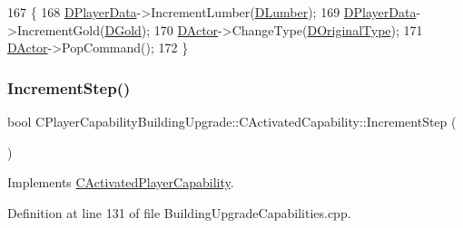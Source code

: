\begin{DoxyCode}
167                                                                  \{
168     \hyperlink{classCActivatedPlayerCapability_a9bf27c322a73f4b11c8183cc1973c3d8}{DPlayerData}->IncrementLumber(\hyperlink{classCPlayerCapabilityBuildingUpgrade_1_1CActivatedCapability_a497437c6eb755ccc9b18ff2a1e704c72}{DLumber});
169     \hyperlink{classCActivatedPlayerCapability_a9bf27c322a73f4b11c8183cc1973c3d8}{DPlayerData}->IncrementGold(\hyperlink{classCPlayerCapabilityBuildingUpgrade_1_1CActivatedCapability_a86bea8030ade6995b4bb5b253fe9466c}{DGold});
170     \hyperlink{classCActivatedPlayerCapability_a54ca944b47bff2718330639941d402b0}{DActor}->ChangeType(\hyperlink{classCPlayerCapabilityBuildingUpgrade_1_1CActivatedCapability_a9418eb8f3401f341c688f00cf8c4aa53}{DOriginalType});
171     \hyperlink{classCActivatedPlayerCapability_a54ca944b47bff2718330639941d402b0}{DActor}->PopCommand();
172 \}
\end{DoxyCode}
\hypertarget{classCPlayerCapabilityBuildingUpgrade_1_1CActivatedCapability_acc732144e87e5fc88117c0b3a032a97a}{}\label{classCPlayerCapabilityBuildingUpgrade_1_1CActivatedCapability_acc732144e87e5fc88117c0b3a032a97a} 
\subsubsection{\texorpdfstring{Increment\+Step()}{IncrementStep()}}
{\footnotesize\ttfamily bool C\+Player\+Capability\+Building\+Upgrade\+::\+C\+Activated\+Capability\+::\+Increment\+Step (\begin{DoxyParamCaption}{ }\end{DoxyParamCaption})\hspace{0.3cm}{\ttfamily [virtual]}}



Implements \hyperlink{classCActivatedPlayerCapability_a943b5999a57504399293250382c0ec6a}{C\+Activated\+Player\+Capability}.



Definition at line 131 of file Building\+Upgrade\+Capabilities.\+cpp.


